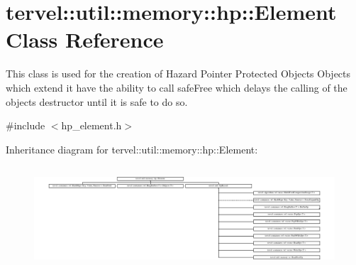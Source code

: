 \hypertarget{classtervel_1_1util_1_1memory_1_1hp_1_1_element}{}\section{tervel\+:\+:util\+:\+:memory\+:\+:hp\+:\+:Element Class Reference}
\label{classtervel_1_1util_1_1memory_1_1hp_1_1_element}


This class is used for the creation of Hazard Pointer Protected Objects Objects which extend it have the ability to call safe\+Free which delays the calling of the objects destructor until it is safe to do so.  




{\ttfamily \#include $<$hp\+\_\+element.\+h$>$}

Inheritance diagram for tervel\+:\+:util\+:\+:memory\+:\+:hp\+:\+:Element\+:\begin{figure}[H]
\begin{center}
\leavevmode
\includegraphics[height=3.853211cm]{classtervel_1_1util_1_1memory_1_1hp_1_1_element}
\end{center}
\end{figure}
